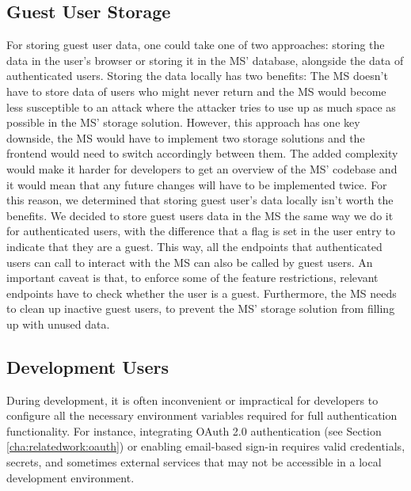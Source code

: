 \subsection{Guest User Storage}

For storing guest user data, one could take one of two approaches:
storing the data in the user's browser or storing it in the MS' database, alongside the
data of authenticated users.
Storing the data locally has two benefits:
The MS doesn't have to store data of users who might never return and
the MS would become less susceptible to an attack where the attacker tries to use up as
much space as possible in the MS' storage solution.
However, this approach has one key downside, the MS would have to implement two storage
solutions and the frontend would need to switch accordingly between them.
The added complexity would make it harder for developers to get an overview of the MS'
codebase and it would mean that any future changes will have to be implemented twice.
For this reason, we determined that storing guest user's data locally isn't worth the benefits.
We decided to store guest users data in the MS the same way we do it for
authenticated users,
with the difference that a flag is set
in the user entry to indicate that they are a guest.
This way, all the endpoints that authenticated users can call to interact with the MS
can also be called by guest users.
An important caveat is that, to enforce some of the feature restrictions, relevant
endpoints have to check whether the user is a guest.
Furthermore, the MS needs to clean up inactive guest users, to prevent the MS' storage
solution from filling up with unused data.

\subsection{Development Users}

During development, it is often inconvenient or impractical for developers to configure all the necessary environment variables required for full authentication functionality.
For instance, integrating OAuth 2.0 authentication (see Section \ref{cha:relatedwork:oauth}) or enabling email-based sign-in requires valid credentials, secrets, and sometimes external services that may not be accessible in a local development environment.

